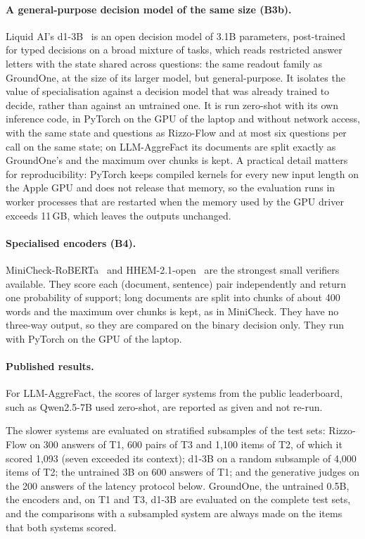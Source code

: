 \paragraph{A general-purpose decision model of the same size (B3b).} Liquid AI's d1-3B~\cite{liquid2026d1} is an open
decision model of 3.1B parameters, post-trained for typed decisions on a broad mixture of tasks, which reads restricted
answer letters with the state shared across questions: the same readout family as GroundOne, at the size of its larger
model, but general-purpose. It isolates the value of specialisation against a decision model that was already trained to
decide, rather than against an untrained one. It is run zero-shot with its own inference code, in PyTorch on the GPU of
the laptop and without network access, with the same state and questions as Rizzo-Flow and at most six questions per call
on the same state; on LLM-AggreFact its documents are split exactly as GroundOne's and the maximum over chunks is kept.
A practical detail matters for reproducibility: PyTorch keeps compiled kernels for every new input length on the Apple
GPU and does not release that memory, so the evaluation runs in worker processes that are restarted when the memory used
by the GPU driver exceeds 11\,GB, which leaves the outputs unchanged.

\paragraph{Specialised encoders (B4).} MiniCheck-RoBERTa~\cite{tang2024minicheck} and HHEM-2.1-open~\cite{vectara2024hhem}
are the strongest small verifiers available. They score each (document, sentence) pair independently and return one
probability of support; long documents are split into chunks of about 400 words and the maximum over chunks is kept, as
in MiniCheck. They have no three-way output, so they are compared on the binary decision only. They run with PyTorch on
the GPU of the laptop.

\paragraph{Published results.} For LLM-AggreFact, the scores of larger systems from the public leaderboard, such as
Qwen2.5-7B used zero-shot, are reported as given and not re-run.

The slower systems are evaluated on stratified subsamples of the test sets: Rizzo-Flow on 300 answers of T1, 600 pairs
of T3 and 1{,}100 items of T2, of which it scored 1{,}093 (seven exceeded its context); d1-3B on a random subsample of
4{,}000 items of T2; the untrained 3B on 600 answers of T1; and the generative judges on the 200 answers of the latency protocol below. GroundOne, the untrained 0.5B, the
encoders and, on T1 and T3, d1-3B are evaluated on the complete test sets, and the comparisons with a subsampled system are always made on the
items that both systems scored.

